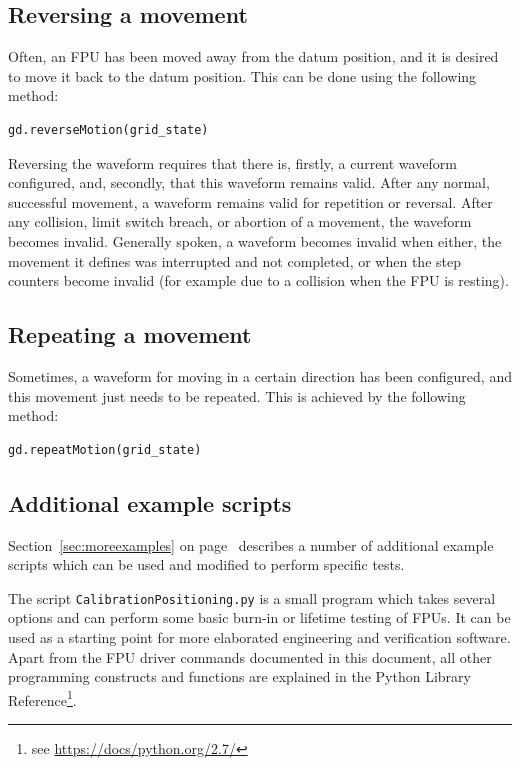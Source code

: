 \documentclass[11pt,a4paper]{report}
\begin{document}
\subsection{Reversing a movement}
Often, an FPU has been moved away from the datum position, and it is
desired to move it back to the datum position.  This can be done using
the following method:

\begin{verbatim}
gd.reverseMotion(grid_state)
\end{verbatim}

Reversing the waveform requires that there is, firstly, a current
waveform configured, and, secondly, that this waveform remains valid.
After any normal, successful movement, a waveform remains valid for
repetition or reversal. After any collision, limit switch breach, or
abortion of a movement, the waveform becomes invalid. Generally
spoken, a waveform becomes invalid when either, the movement it
defines was interrupted and not completed, or when the step counters
become invalid (for example due to a collision when the FPU is
resting).


\subsection{Repeating a movement}
Sometimes, a waveform for moving in a certain direction has been
configured, and this movement just needs to be repeated.  This is
achieved by the following method:

\begin{verbatim}
gd.repeatMotion(grid_state)
\end{verbatim}

\subsection{Additional example scripts}

Section~\ref{sec:moreexamples} on page~\pageref{sec:moreexamples}
describes a number of additional example scripts which can be used and
modified to perform specific tests.

The script \texttt{CalibrationPositioning.py} is a small program which
takes several options and can perform some basic burn-in or lifetime
testing of FPUs. It can be used as a starting point for more
elaborated engineering and verification software. Apart from the FPU
driver commands documented in this document, all other programming
constructs and functions are explained in the Python Library
Reference\footnote{see \url{https://docs/python.org/2.7/}}.
\end{document}
